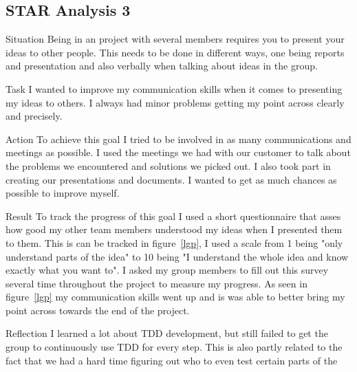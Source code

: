 \documentclass[12pt]{article}
\begin{document}
\subsection{STAR Analysis 3}
\begin{STAR}
    \item[Situation] Being in an project with several members requires you to present your ideas to other people. This needs to be done in different ways, one being reports and presentation and also verbally when talking about ideas in the group.
    \item[Task]
    I wanted to improve my communication skills when it comes to presenting my ideas to others. I always had minor problems getting my point across clearly and precisely.
    \item[Action] To achieve this goal I tried to be involved in as many communications and meetings as possible. I used the meetings we had with our customer to talk about the problems we encountered and solutions we picked out. I also took part in creating our presentations and documents. I wanted to get as much chances as possible to improve myself.
    \item[Result]
    To track the progress of this goal I used a short questionnaire that asses how good my other team members understood my ideas when I presented them to them. This is can be tracked in figure~\ref{lgp}, I used a scale from 1 being "only understand parts of the idea" to 10 being "I understand the whole idea and know exactly what you want to". I asked my group members to fill out this survey several time throughout the project to measure my progress. As seen in figure~\ref{lgp} my communication skills went up and is was able to better bring my point across towards the end of the project.
    \item[Reflection] I learned a lot about TDD development, but still failed to get the group to continuously use TDD for every step. This is also partly related to the fact that we had a hard time figuring out who to even test certain parts of the 
\end{STAR}



%
\end{document}
